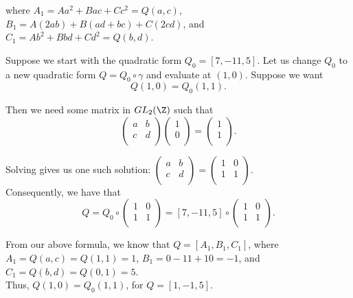 \documentclass[11pt]{article}
\begin{document}
where $A_1 = Aa^2 + Bac + Cc^2 = Q(a, c)$, $B_1 = A(2ab) + B(ad + bc) + C(2cd)$, and $C_1 = Ab^2 + Bbd + Cd^2 = Q(b, d)$.

\begin{eg}
Suppose we start with the quadratic form $Q_0 = [7, -11, 5]$.
Let us change $Q_0$ to a new quadratic form $Q = Q_0 \circ \gamma$ and evaluate at $(1, 0)$. Suppose we want 
\[
    Q(1, 0) = Q_0(1, 1).
\]

Then we need some matrix in $GL_2(\Z)$ such that 
\[
    \begin{pmatrix}
        a & b \\
        c & d \\
    \end{pmatrix} 
    \begin{pmatrix}
        1 \\
        0\\
    \end{pmatrix} =
    \begin{pmatrix}
        1 \\
        1 \\
    \end{pmatrix}.
\]

Solving gives us one such solution: $\begin{pmatrix}
    a & b \\
    c & d \\
\end{pmatrix} = \begin{pmatrix}
    1 & 0 \\
    1 & 1 \\
\end{pmatrix}.$ \\

Consequently, we have that 
\[
    Q = Q_0 \circ \begin{pmatrix}
        1 & 0 \\
        1 & 1 \\
    \end{pmatrix} = [7, -11, 5] \circ \begin{pmatrix}
        1 & 0 \\
        1 & 1 \\
    \end{pmatrix}.
\]

From our above formula, we know that $Q = [A_1, B_1, C_1]$, where $A_1 = Q(a, c) = Q(1, 1) = 1$, $B_1 = 0-11+10 = -1$, and $C_1 = Q(b, d) = Q(0, 1) = 5$. \\

Thus, $Q(1, 0) = Q_0(1, 1)$, for $Q = [1, -1, 5]$.
\end{eg}
\end{document}
